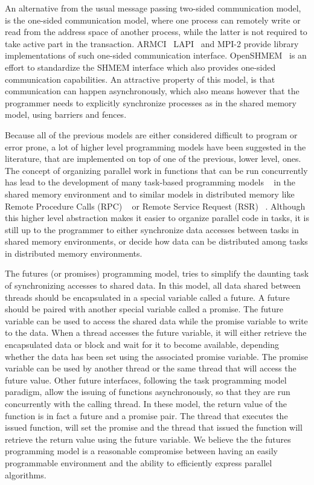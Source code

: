 An alternative from the usual message passing two-sided communication model, 
is the one-sided communication model, where one process can remotely write
or read from the address space of another process, while the latter is not required 
to take active part in the transaction.  ARMCI~\cite{Nieplocha99armci:a} 
LAPI~\cite{Shah:1998:PEL:876880.879642} and MPI-2 provide library implementations of such 
one-sided communication interface.  OpenSHMEM~\cite{Chapman:2010:IOS:2020373.2020375} is 
an effort to standardize the SHMEM interface which also provides one-sided communication
capabilities.  An attractive property of this model, is that communication can happen 
asynchronously, which also means however that the programmer needs to explicitly synchronize
processes as in the shared memory model, using barriers and fences.


Because all of the previous models are either considered difficult to program or error prone, a lot of higher 
level programming models have been suggested in the literature, that are implemented on top of one of the 
previous, lower level, ones.  The concept of organizing parallel work in functions that can be run
concurrently has lead to the development of many task-based programming models
~\cite{Ayguade:2009:DOT:1512157.1512430, Blumofe95cilk:an} in the shared memory
environment and to similar models in distributed memory like Remote Procedure Calls (RPC)
~\cite{Saunders:2003:AAP:966049.781534,Beckman96tulip:a,Vadhiyar03gradsolve-}
or Remote Service Request (RSR) ~\cite{Foster96thenexus}.  Although this higher level
abstraction makes it easier to organize parallel code in tasks, it is still up to the 
programmer to either synchronize data accesses between tasks in shared memory environments,
or decide how data can be distributed among tasks in distributed memory environments.

The futures (or promises) programming model, tries to simplify the daunting task of synchronizing
accesses to shared data.  In this model, all data shared between threads should be encapsulated 
in a special variable called a future.  A future should be paired with another special variable
called a promise.  The future variable can be used to access the shared data while the promise 
variable to write to the data.  When a thread accesses the future variable, it will either retrieve
the encapsulated data or block and wait for it to become available, depending whether the data has 
been set using the associated promise variable.  The promise variable can be used by another thread
or the same thread that will access the future value.  Other future interfaces, following the task 
programming model paradigm, allow the issuing of functions asynchronously, so that they are run 
concurrently with the calling thread.  In these model, the return value of the function is in fact
a future and a promise pair.  The thread that executes the issued function, will set the promise
and the thread that issued the function will retrieve the return value using the future variable. 
We believe the the futures programming model
is a reasonable compromise between having an easily programmable environment and the ability to 
efficiently express parallel algorithms.

